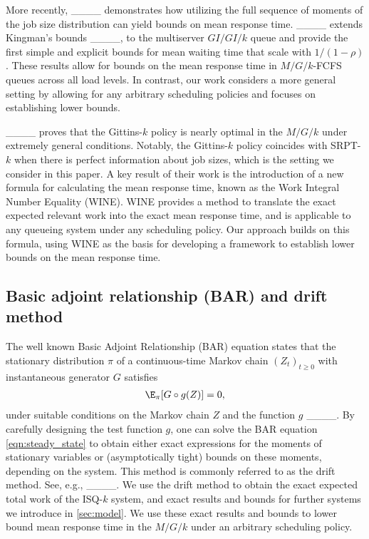 More recently, ____ demonstrates how utilizing the full sequence of moments of the job size distribution can yield 
bounds on mean response time. ____ extends Kingman’s bounds ____, to the multiserver $GI/GI/k$ queue and provide the first simple and explicit bounds for mean waiting time that scale with $1/(1-\rho)$.  These results allow for bounds on the mean response time in $M/G/k$-FCFS queues across all load levels. In contrast, our work considers a more general setting by allowing for any arbitrary scheduling policies and focuses on establishing lower bounds.

____ proves that the Gittins-$k$ policy is nearly optimal in the $M/G/k$ under extremely general conditions. Notably, the Gittins-$k$ policy coincides with SRPT-$k$ when there is perfect information about job sizes, which is the setting we consider in this paper. A key result of their work is the introduction of a new formula for calculating the mean response time, known as the Work Integral Number Equality (WINE). WINE provides a method to translate the exact expected relevant work into the exact mean response time, and is applicable to any queueing system under any scheduling policy. Our approach builds on this formula, using WINE as the basis for developing a framework to establish lower bounds on the mean response time. 

\subsection{Basic adjoint relationship (BAR) and drift method}
\label{sub_sec:prior_bar}

The well known Basic Adjoint Relationship (BAR) equation states that the stationary distribution $\pi$ of a continuous-time Markov chain $(Z_t)_{t\geq 0}$ with instantaneous generator $G$ satisfies
\begin{align}
\label{eqn:steady_state}
    \E_{\pi}[G\circ g(Z)]=0,
\end{align}
under suitable conditions on the Markov chain $Z$ and the function $g$ ____. By carefully designing the test function $g$, one can solve the BAR equation \eqref{eqn:steady_state} to obtain either exact expressions for the moments of stationary variables or (asymptotically tight) bounds on these moments, depending on the system. This method is commonly referred to as the drift method. See, e.g.,  ____. We use the drift method to obtain the exact expected total work of the ISQ-$k$ system,
and exact results and bounds for further systems we introduce in \cref{sec:model}. We use these exact results and bounds to lower bound mean response time in the $M/G/k$ under an arbitrary scheduling policy.
